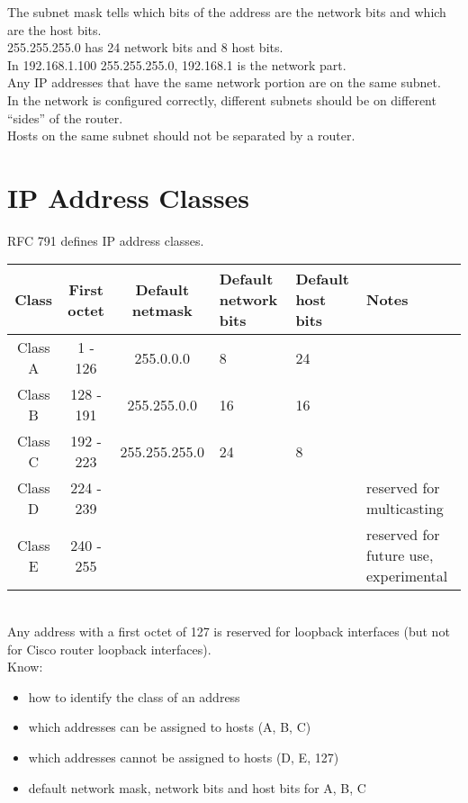 \documentclass{article}
\begin{document}
The subnet mask tells which bits of the address are the network bits and
which are the host bits.\\

255.255.255.0 has 24 network bits and 8 host bits.\\

In 192.168.1.100 255.255.255.0, 192.168.1 is the network part.\\

Any IP addresses that have the same network portion are on the same subnet.\\

In the network is configured correctly, different subnets should be on different
``sides'' of the router.\\

Hosts on the same subnet should not be separated by a router.

\section{IP Address Classes}

RFC 791 defines IP address classes.

\begin{tabular}{ | c | c | c | p{1cm} | p{1cm} | p{4cm} | }
\hline
Class & First octet & Default netmask & Default network bits & Default host bits & Notes \\ \hline
Class A & 1 - 126 & 255.0.0.0 & 8 & 24 & \\ \hline
Class B & 128 - 191 & 255.255.0.0 & 16 & 16 & \\ \hline
Class C & 192 - 223 & 255.255.255.0 & 24 & 8 & \\ \hline
Class D & 224 - 239 & & & & reserved for multicasting \\ \hline
Class E & 240 - 255 & & & & reserved for future use, experimental \\ \hline
\end{tabular}\\

Any address with a first octet of 127 is reserved for loopback interfaces
(but not for Cisco router loopback interfaces).\\

Know:

\begin{itemize}

\item how to identify the class of an address
\item which addresses can be assigned to hosts (A, B, C)
\item which addresses cannot be assigned to hosts (D, E, 127)
\item default network mask, network bits and host bits for A, B, C

\end{itemize}
\end{document}
